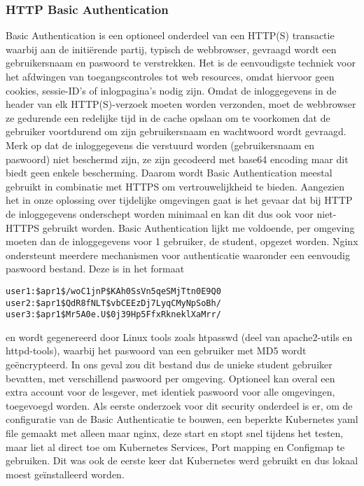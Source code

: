 \subsubsection{HTTP Basic Authentication}
\autocite{Wikipedia2023b}
Basic Authentication is een optioneel onderdeel van een HTTP(S) transactie waarbij aan de initiërende partij, typisch de webbrowser, gevraagd wordt een gebruikersnaam en paswoord te verstrekken. Het is de eenvoudigste techniek voor het afdwingen van toegangscontroles tot web resources, omdat hiervoor geen cookies, sessie-ID's of inlogpagina's nodig zijn.
Omdat de inloggegevens in de header van elk HTTP(S)-verzoek moeten worden verzonden, moet de webbrowser ze gedurende een redelijke tijd in de cache opslaan om te voorkomen dat de gebruiker voortdurend om zijn gebruikersnaam en wachtwoord wordt gevraagd.
Merk op dat de inloggegevens die verstuurd worden (gebruikersnaam en paswoord) niet beschermd zijn, ze zijn gecodeerd met base64 encoding maar dit biedt geen enkele bescherming. Daarom wordt Basic Authentication meestal gebruikt in combinatie met HTTPS om vertrouwelijkheid te bieden. Aangezien het in onze oplossing over tijdelijke omgevingen gaat is het gevaar dat bij HTTP de inloggegevens onderschept worden minimaal en kan dit dus ook voor niet-HTTPS gebruikt worden.
\newline
\newline
Basic Authentication lijkt me voldoende, per omgeving moeten dan de inloggegevens voor 1 gebruiker, de student, opgezet worden. Nginx ondersteunt meerdere mechanismen voor authenticatie waaronder een eenvoudig paswoord bestand. Deze is in het formaat
\newline
\newline
\begin{lstlisting}
user1:$apr1$/woC1jnP$KAh0SsVn5qeSMjTtn0E9Q0
user2:$apr1$QdR8fNLT$vbCEEzDj7LyqCMyNpSoBh/
user3:$apr1$Mr5A0e.U$0j39Hp5FfxRkneklXaMrr/ 
\end{lstlisting}


en wordt gegenereerd door Linux tools zoals htpasswd (deel van apache2-utils en httpd-tools), waarbij het paswoord van een gebruiker met MD5 wordt geëncrypteerd. In ons geval zou dit bestand dus de unieke student gebruiker bevatten, met verschillend paswoord per omgeving.
Optioneel kan overal een extra account voor de lesgever, met identiek paswoord voor alle omgevingen, toegevoegd worden.
\newline
\newline
Als eerste onderzoek voor dit security onderdeel is er, om de configuratie van de Basic Authenticatie te bouwen, een beperkte Kubernetes yaml file gemaakt met alleen maar nginx, deze start en stopt snel tijdens het testen, maar liet al direct toe om Kubernetes Services, Port mapping en Configmap te gebruiken. Dit was ook de eerste keer dat Kubernetes werd gebruikt en dus lokaal moest geïnstalleerd worden.
\newline
\newline
